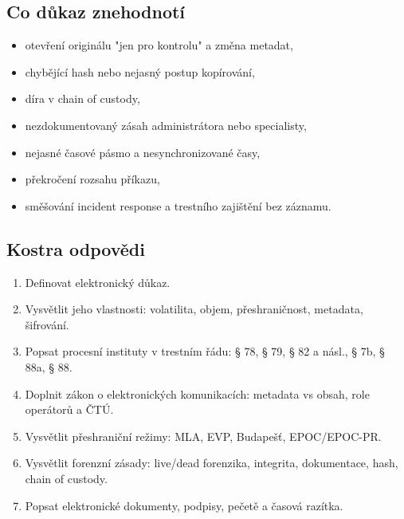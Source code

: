 \subsection*{Co důkaz znehodnotí}
\begin{itemize}
  \item otevření originálu "jen pro kontrolu" a změna metadat,
  \item chybějící hash nebo nejasný postup kopírování,
  \item díra v chain of custody,
  \item nezdokumentovaný zásah administrátora nebo specialisty,
  \item nejasné časové pásmo a nesynchronizované časy,
  \item překročení rozsahu příkazu,
  \item směšování incident response a trestního zajištění bez záznamu.
\end{itemize}



\newpage

\iffalse


\subsection*{Kostra odpovědi}
\begin{enumerate}
  \item Definovat elektronický důkaz.
  \item Vysvětlit jeho vlastnosti: volatilita, objem, přeshraničnost, metadata, šifrování.
  \item Popsat procesní instituty v trestním řádu: § 78, § 79, § 82 a násl., § 7b, § 88a, § 88.
  \item Doplnit zákon o elektronických komunikacích: metadata vs obsah, role operátorů a ČTÚ.
  \item Vysvětlit přeshraniční režimy: MLA, EVP, Budapešť, EPOC/EPOC-PR.
  \item Vysvětlit forenzní zásady: live/dead forenzika, integrita, dokumentace, hash, chain of custody.
  \item Popsat elektronické dokumenty, podpisy, pečetě a časová razítka.
\end{enumerate}

